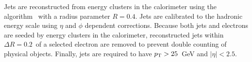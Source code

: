 


Jets are reconstructed from energy clusters in the calorimeter using the {\it \AKT} algorithm~\cite{Cacciari:2008gp}
with a radius parameter $R = 0.4$.
Jets are calibrated to the hadronic energy scale using $\eta$ and $\phi$ dependent corrections.
Because both jets and electrons are seeded by energy clusters in the calorimeter,
reconstructed jets within $\Delta R=0.2$\ of a selected electron are removed to
prevent double counting of physical objects.
Finally, jets are required to have $p_{\mathrm{T}}>25$~GeV and $|\eta|<2.5$.





